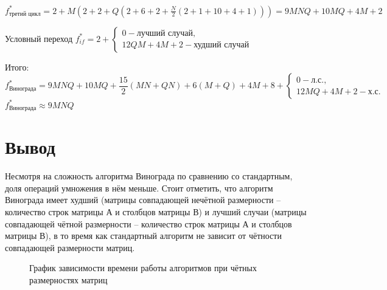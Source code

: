             $ f_\text{третий цикл}^* = 2 + M(2 + 2 + Q(2 + 6 + 2 + \frac{N}{2}(2 + 1 + 10 + 4 + 1))) = 9MNQ + 10MQ + 4M + 2$

            Условный переход $f_{if}^* = 2 + \left\{
                \begin{matrix}
                0 - \text{лучший случай},\\
                12QM + 4M + 2 - \text{худший случай} 
                \end{matrix}\right.$

            Итого:
            \begin{equation}
                f_\text{Винограда}^* = 9MNQ + 10MQ + \frac{15}{2}(MN + QN) + 6(M + Q) + 4M + 8 + 
                    \left\{ \begin{matrix}
                    0 - \text{л.с.},\\
                    12MQ + 4M + 2 - \text{х.с.} 
                    \end{matrix}\right.
            \end{equation}
            $ f_\text{Винограда}^* \approx 9MNQ $

    \section{Вывод}
        Несмотря на сложность алгоритма Винограда по сравнению со стандартным, доля операций умножения в нём меньше.
        Стоит отметить, что алгоритм Винограда имеет худший (матрицы совпадающей нечётной размерности -- количество строк матрицы А и столбцов матрицы В) и лучший случаи (матрицы совпадающей чётной размерности -- количество строк матрицы А и столбцов матрицы В),
        в то время как стандартный алгоритм не зависит от чётности совпадающей размерности матриц.


    \begin{figure}[h!]
        \centering
        \caption{График зависимости времени работы алгоритмов при чётных размерностях матриц} 
        \label{graph:test:1}
    \end{figure}

